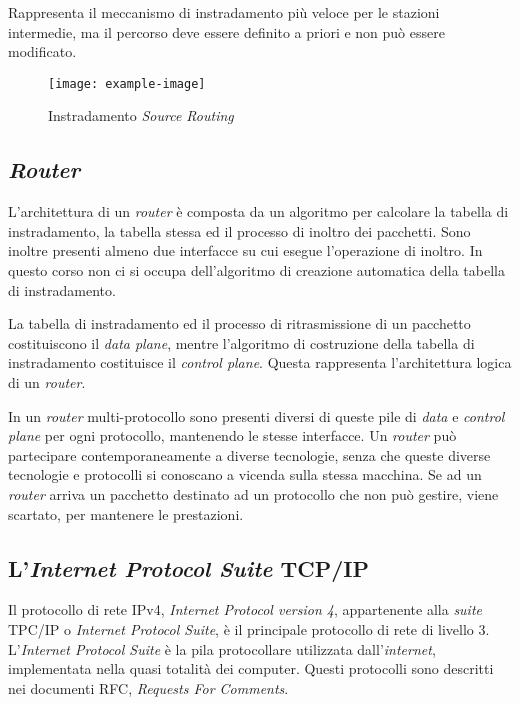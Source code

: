 \documentclass{article}
\numberwithin{equation}{subsection}
\begin{document}
Rappresenta il meccanismo di instradamento più veloce per le stazioni intermedie, ma il percorso deve essere definito a priori e non può essere modificato. 

\begin{figure}[H]%
    \centering%
    \texttt{[image: example-image]}%
    \caption{Instradamento \textit{Source Routing}}%
\end{figure}

\subsection{\textit{Router}}

L'architettura di un \textit{router} è composta da un algoritmo per calcolare la tabella di instradamento, la tabella stessa ed il processo di inoltro dei pacchetti. Sono inoltre presenti almeno due interfacce su cui esegue l'operazione di inoltro. In questo 
corso non ci si occupa dell'algoritmo di creazione automatica della tabella di instradamento. 

La tabella di instradamento ed il processo di ritrasmissione di un pacchetto costituiscono il \textit{data plane}, mentre l'algoritmo di costruzione 
della tabella di instradamento costituisce il \textit{control plane}. Questa rappresenta l'architettura logica di un \textit{router}. 

In un \textit{router} multi-protocollo sono presenti diversi di queste pile di \textit{data} e \textit{control plane} per ogni protocollo, mantenendo le stesse interfacce. 
Un \textit{router} può partecipare contemporaneamente a diverse tecnologie, senza che queste diverse tecnologie e protocolli si conoscano a vicenda sulla stessa macchina. Se ad un \textit{router} 
arriva un pacchetto destinato ad un protocollo che non può gestire, viene scartato, per mantenere le prestazioni. 

\subsection{L'\textit{Internet Protocol Suite} \textcolor{Bittersweet}{TCP}/\textcolor{Bittersweet}{IP}}

Il protocollo di rete \textcolor{BurntOrange}{IPv4}, \textit{Internet Protocol version 4}, appartenente alla \textit{suite} \textcolor{Bittersweet}{TPC}/\textcolor{Bittersweet}{IP} o \textit{Internet Protocol Suite}, è il principale protocollo di rete 
di livello 3. L'\textit{Internet Protocol Suite} è la pila protocollare utilizzata dall'\textit{internet}, implementata nella quasi totalità dei computer. Questi protocolli 
sono descritti nei documenti RFC, \textit{Requests For Comments}. 
\end{document}
